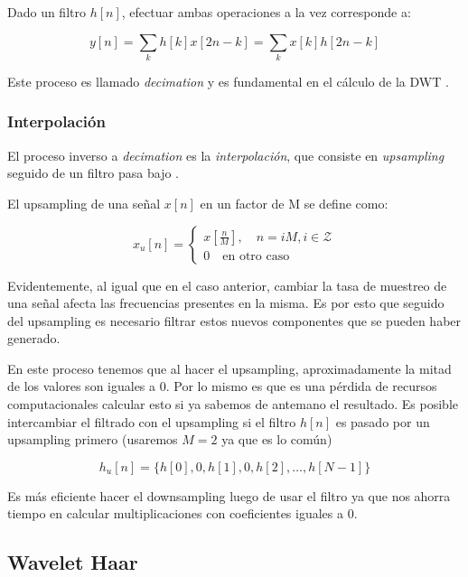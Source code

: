 \documentclass[conference]{IEEEtran}
\begin{document}
Dado un filtro $h[n]$, efectuar ambas operaciones a la vez corresponde a:

\begin{equation}
  y[n] = \sum_k h[k]x[2n-k] = \sum_k x[k]h[2n-k]
\end{equation}

Este proceso es llamado \emph{decimation} y es fundamental en el cálculo de la DWT    \cite{dwt}.



\subsubsection{Interpolación}

El proceso inverso a \emph{decimation} es la \emph{interpolación}, que consiste en \emph{upsampling} seguido de un filtro pasa bajo   \cite{dwt}.

El upsampling de una señal $x[n]$ en un factor de M se define como:

\begin{equation}
  x_u[n] =
  \begin{cases}
    x\left[\frac{n}{M}\right], \quad n = iM, i \in \mathcal{Z}\\
    0 \quad \text{en otro caso}
  \end{cases}
\end{equation}


Evidentemente, al igual que en el caso anterior, cambiar la tasa de muestreo de una señal afecta las frecuencias presentes en la misma. Es por esto que seguido del upsampling es necesario filtrar estos nuevos componentes que se pueden haber generado.

En este proceso tenemos que al hacer el upsampling, aproximadamente la mitad de los valores son iguales a 0. Por lo mismo es que es una pérdida de recursos computacionales calcular esto si ya sabemos de antemano el resultado. Es posible intercambiar el filtrado con el upsampling si el filtro $h[n]$ es pasado por un upsampling primero (usaremos $M=2$ ya que es lo común)

\begin{equation}
  h_u[n] = \{h[0], 0, h[1], 0, h[2], \hdots, h[N-1]\}
\end{equation}

Es más eficiente hacer el downsampling luego de usar el filtro ya que nos ahorra tiempo en calcular multiplicaciones con coeficientes iguales a 0.


\subsection{Wavelet Haar}
\end{document}
